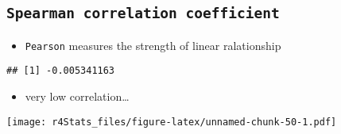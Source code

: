 \documentclass[
]{book}
\newenvironment{Shaded}{\begin{snugshade}}{\end{snugshade}}
\newcommand{\DecValTok}[1]{\textcolor[rgb]{0.00,0.00,0.81}{#1}}
\newcommand{\FunctionTok}[1]{\textcolor[rgb]{0.00,0.00,0.00}{#1}}
\newcommand{\NormalTok}[1]{#1}
\newcommand{\OtherTok}[1]{\textcolor[rgb]{0.56,0.35,0.01}{#1}}
\newcommand{\SpecialCharTok}[1]{\textcolor[rgb]{0.00,0.00,0.00}{#1}}
\providecommand{\tightlist}{%
  \setlength{\itemsep}{0pt}\setlength{\parskip}{0pt}}
\theoremstyle{definition}
\theoremstyle{definition}
\theoremstyle{definition}
\theoremstyle{definition}
\theoremstyle{remark}
\begin{document}
\hypertarget{spearman-correlation-coefficient}{%
\subsection{\texorpdfstring{\texttt{Spearman\ correlation\ coefficient}}{Spearman correlation coefficient}}\label{spearman-correlation-coefficient}}

\begin{itemize}
\tightlist
\item
  \texttt{Pearson} measures the strength of linear ralationship
\end{itemize}

\begin{Shaded}
\end{Shaded}

\begin{verbatim}
## [1] -0.005341163
\end{verbatim}

\begin{itemize}
\tightlist
\item
  very low correlation\ldots{}
\end{itemize}

\begin{Shaded}
\end{Shaded}

\texttt{[image: r4Stats\_files/figure-latex/unnamed-chunk-50-1.pdf]}

\begin{Shaded}
\end{Shaded}
\end{document}
